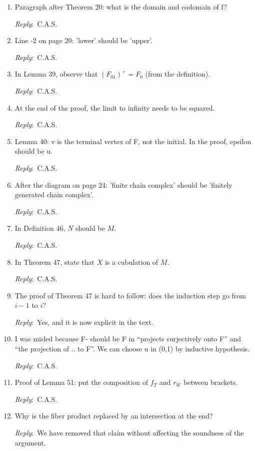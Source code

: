 \documentclass{amsart}
\newcommand{\ar}{\medskip\noindent\textit{Reply}:\ }
\newcommand{\tbw}{\ar \hrulefill}
\newcommand{\cas}{\ar C.A.S.}
\begin{document}
\begin{enumerate}
	Greg. \tbw

	\item Paragraph after Theorem 20: what is the domain and codomain of f?

	\cas

	\item Line -2 on page 20: 'lower' should be 'upper'.

	\cas

	\item In Lemma 39, observe that $(F_{01})^+ = F_0$ (from the definition).

	\cas

	\item At the end of the proof, the limit to infinity needs to be squared.

	\cas

	\item Lemma 40: v is the terminal vertex of F, not the initial. In the proof, epsilon should be u.

	\cas

	\item After the diagram on page 24: 'finite chain complex' should be 'finitely generated chain complex'.

	\cas

	\item In Definition 46, $N$ should be $M$.

	\cas

	\item In Theorem 47, state that $X$ is a cubulation of $M$.

	\cas

	\item The proof of Theorem 47 is hard to follow: does the induction step go from $i-1$ to $i$?

	\ar Yes, and it is now explicit in the text.

	\item I was misled because F- should be F in “projects surjectively onto F” and “the projection of .. to F”. We can choose u in (0,1) by inductive hypothesis.

	\cas

	\item Proof of Lemma 51: put the composition of $f_T$ and $r_W$ between brackets.

	\cas

	\item Why is the fiber product replaced by an intersection at the end?

	\ar We have removed that claim without affecting the soundness of the argument.


\end{enumerate}
\end{document}

